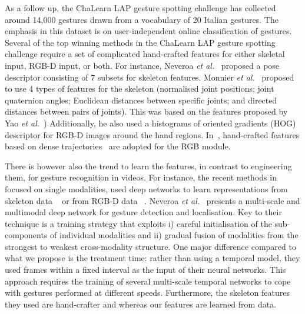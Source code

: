 As a follow up, the ChaLearn LAP \cite{chalearnLAP} gesture spotting challenge has collected around 14,000 gestures drawn from a vocabulary of 20 Italian gestures. The emphasis in this dataset is on user-independent online classification of gestures. Several of the top winning methods in the ChaLearn LAP gesture spotting challenge require a set of complicated hand-crafted features for either skeletal input, RGB-D input, or both.
For instance, Neveroa \emph{et al.}~\cite{neverova2014multi} proposed a pose descriptor consisting of 7 subsets for skeleton features. Monnier \emph{et al.}~\cite{Monnier2014multi} proposed to use 4 types of features for the skeleton (normalised joint positions; joint quaternion angles; Euclidean distances between specific joints; and directed distances between pairs of joints). This was based on the features proposed by Yao \emph{et al.}~\cite{yao2011does}) Additionally, he also used a histograms of oriented gradients (HOG) descriptor for RGB-D images around the hand regions.
In~\cite{Peng2014multi}, hand-crafted features based on dense trajectories~\cite{wang2013dense} are adopted for the RGB module. 

There is however also the trend to learn the features, in contrast to engineering them, for gesture recognition in videos.
%
For instance, the recent methods in \cite{wu2014deep,lio2014deep} focused on single modalities,
used deep networks to learn representations from skeleton data ~\cite{wu2014deep} or from RGB-D data ~\cite{lio2014deep}.
%
Neveroa \emph{et al.}~\cite{neverova2014multi} presents a multi-scale and multimodal deep network for gesture detection and localisation.
Key to their technique is a training strategy that exploits i) careful initialisation of the sub-components of individual modalities and ii) gradual fusion of modalities from the strongest to weakest cross-modality structure.
%
One major difference compared to what we propose is the treatment time:
rather than using a temporal model, they used frames within a fixed interval as the input of their neural networks. This approach requires the training of several multi-scale temporal networks  to cope with gestures performed at different speeds.
%
Furthermore, the skeleton features they used are hand-crafter and whereas our features are learned from data.

\endinput
